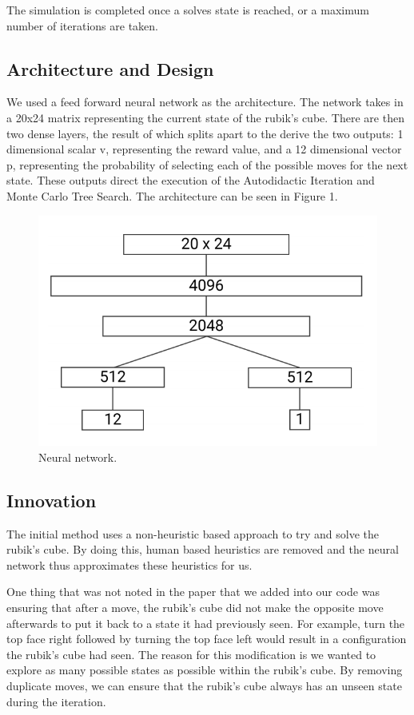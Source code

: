 \documentclass[10pt,twocolumn,letterpaper]{article}
\begin{document}
The simulation is completed once a solves state is reached, or a maximum number of iterations are taken.

\subsection{Architecture and Design}
We used a feed forward neural network as the architecture.  The network takes in a 20x24 matrix representing the current state of the rubik's cube.  There are then two dense layers, the result of which splits apart to the derive the two outputs: 1 dimensional scalar v, representing the reward value, and a 12 dimensional vector p, representing the probability of selecting each of the possible moves for the next state.  These outputs direct the execution of the Autodidactic Iteration and Monte Carlo Tree Search. The architecture can be seen in Figure 1.

\begin{figure}
  \includegraphics[width=\linewidth]{net.png}
  \caption{Neural network.}
  \label{fig:net}
\end{figure}

\subsection{Innovation}
The initial method uses a non-heuristic based approach to try and solve the rubik's cube. By doing this, human based heuristics are removed and the neural network thus approximates these heuristics for us. 

One thing that was not noted in the paper that we added into our code was ensuring that after a move, the rubik's cube did not make the opposite move afterwards to put it back to a state it had previously seen. For example, turn the top face right followed by turning the top face left would result in a configuration the rubik's cube had seen. The reason for this modification is we wanted to explore as many possible states as possible within the rubik's cube. By removing duplicate moves, we can ensure that the rubik's cube always has an unseen state during the iteration.
\end{document}
